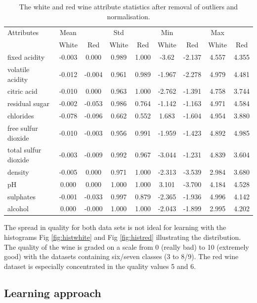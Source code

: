 \documentclass[10pt,twocolumn,letterpaper]{article}
\begin{document}
\begin{table}
	\begin{center}
		\begin{tabular}{|l|cc|cc|cc|cc|}
			\hline
			Attributes 			& Mean 	& 		& Std 	& 		& Min 	& 		& Max 	&		\\
								& White & Red 	& White & Red 	& White & Red 	& White & Red \\
			\hline
			fixed acidity 		& -0.003 & 0.000 & 0.989 & 1.000& -3.62 &-2.137 & 4.557 & 4.355 \\
			volatile acidity 	& -0.012 & -0.004 & 0.961 &0.989 & -1.967 &-2.278& 4.979 & 4.481\\
			citric acid 		& -0.010 & 0.000 & 0.963 & 1.000&-2.762 &-1.391& 4.758 & 3.744\\
			residual sugar 		& -0.002 & -0.053 & 0.986 & 0.764&-1.142 &-1.163& 4.971 & 4.584\\
			chlorides 			& -0.078 & -0.096 & 0.662 &0.552 &1.683 &-1.604& 4.954 & 3.880\\
			free sulfur dioxide & -0.010 & -0.003 & 0.956 & 0.991&-1.959 &-1.423& 4.892 & 4.985\\
			total sulfur dioxide & -0.003 & -0.009 & 0.992 & 0.967&-3.044 &-1.231& 4.839 & 3.604\\
			density 			& -0.005 & 0.000 & 0.971 & 1.000&-2.313 &-3.539& 2.984 & 3.680\\
			pH 					& 0.000 & 0.000 & 1.000 & 1.000&3.101 &-3.700& 4.184 & 4.528\\
			sulphates 			& -0.001 & -0.033 & 0.997 & 0.879&-2.365 &-1.936& 4.996 & 4.142\\
			alcohol 			& 0.000 & -0.000 & 1.000 &1.000 &-2.043 &-1.899& 2.995 & 4.202\\ 
			\hline
		\end{tabular}
	\end{center}
	\caption{The white and red wine attribute statistics after removal of outliers and normalisation.}
	\label{tab:normalised}
\end{table}

The spread in quality for both data sets is not ideal for learning with the histograms Fig \ref{fig:histwhite} and Fig \ref{fig:histred} illustrating the distribution. The quality of the wine is graded on a scale from 0 (really bad) to 10 (extremely good) with the datasets containing six/seven classes (3 to 8/9). The red wine dataset is especially concentrated in the quality values 5 and 6. 

\subsection{Learning approach}
\end{document}

